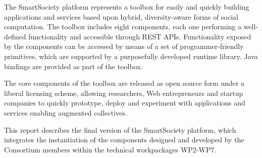 The SmartSociety platform represents a toolbox for easily and quickly building applications and services based upon hybrid, diversity-aware forms of social computation. The toolbox includes eight components, each one performing a well-defined functionality and accessible through REST APIs. Functionality exposed by the components can be accessed by means of a set of programmer-friendly primitives, which are supported by a purposefully developed runtime library. Java bindings are provided as part of the toolbox. 

The core components of the toolbox are released as open source form under a liberal licensing scheme, allowing researchers, Web entrepreneurs and startup companies to quickly prototype, deploy and experiment with applications and services enabling augmented collectives.

This report describes the final version of the SmartSociety platform, which integrates the instantiation of the components designed and developed by the Consortium members within the technical workpackages WP2-WP7. 



